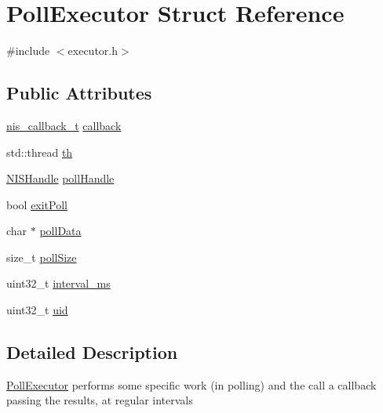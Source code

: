 \hypertarget{structPollExecutor}{\section{Poll\-Executor Struct Reference}
\label{structPollExecutor}
}


{\ttfamily \#include $<$executor.\-h$>$}

\subsection*{Public Attributes}
\begin{DoxyCompactItemize}
\item 
\hyperlink{nis__types_8h_a01a69b218db702baa14290be05ef112d}{nis\-\_\-callback\-\_\-t} \hyperlink{structPollExecutor_a28319240732a17a19f78db7ff325c552}{callback}
\item 
std\-::thread \hyperlink{structPollExecutor_aedea242ce74052608ae9358ec93d70e2}{th}
\item 
\hyperlink{nis__types_8h_aeda8757494329f27e534f367b067eda3}{N\-I\-S\-Handle} \hyperlink{structPollExecutor_ac4006982a46140b6b353c621921d171b}{poll\-Handle}
\item 
bool \hyperlink{structPollExecutor_a22f382f7d74c9cae694dc7b003bb12fb}{exit\-Poll}
\item 
char $\ast$ \hyperlink{structPollExecutor_a6a278f48537a9f9701ff687ccc2125e8}{poll\-Data}
\item 
size\-\_\-t \hyperlink{structPollExecutor_aaac2ecbce031c612792e6aea90196af4}{poll\-Size}
\item 
uint32\-\_\-t \hyperlink{structPollExecutor_aa371cc9916044879d56ddff0a169bc0c}{interval\-\_\-ms}
\item 
uint32\-\_\-t \hyperlink{structPollExecutor_a939fe0fc384eb018f62839be04fa519d}{uid}
\end{DoxyCompactItemize}


\subsection{Detailed Description}
\hyperlink{structPollExecutor}{Poll\-Executor} performs some specific work (in polling) and the call a callback passing the results, at regular intervals 

